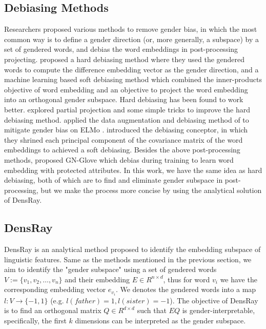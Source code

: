 \subsection{Debiasing Methods}
Researchers proposed various methods to remove gender bias, in which the most common way is to define a gender direction (or, more generally, a subspace) by a set of gendered words, and debias the word embeddings in post-processing projecting. \citet{bolukbasi2016man} proposed a hard debiasing method where they used the gendered words to compute the difference embedding vector as the gender direction, and a machine learning based soft debiasing method which combined the inner-products objective of word embedding and an objective to project the word embedding into an orthogonal gender subspace. Hard debiasing has been found to work better.  \citet{dev2019attenuating} explored partial projection and some simple tricks to improve the hard debiasing method. \citet{zhao2019gender} applied the data augmentation and debiasing method of \citet{bolukbasi2016man} to mitigate gender bias on ELMo \citep{Peters:2018}. \citet{karve2019conceptor} introduced the debiasing conceptor, in which they shrined each principal component of the covariance matrix of the word embeddings to achieved a soft debiasing. Besides the above post-processing methods, \citep{zhao2018learning} proposed GN-Glove which debias during training to learn word embedding with protected attributes. In this work, we have the same idea as hard debiasing, both of which are to find and eliminate gender subspace in post-processing, but we make the process more concise by using the analytical solution of DensRay.

\subsection{DensRay}
DensRay is an analytical method proposed to identify the embedding subspace of linguistic features. Same as the methods mentioned in the previous section, we aim to identify the "gender subspace" using a set of gendered words $V:=\{v_1,v_2,\dots,v_n\}$ and their embedding $E \in R^{n\times d}$, thus for word $v_i$ we have the corresponding embedding vector $e_{v_i}$. We denotes the gendered words into a map $l:V\to \{-1,1\}$ (e.g. $l(father)=1,l(sister)=-1$). The objective of DensRay is to find an orthogonal matrix $Q\in R^{d\times d}$ such that $EQ$ is gender-interpretable, specifically, the first $k$ dimensions can be interpreted as the gender subspace.


